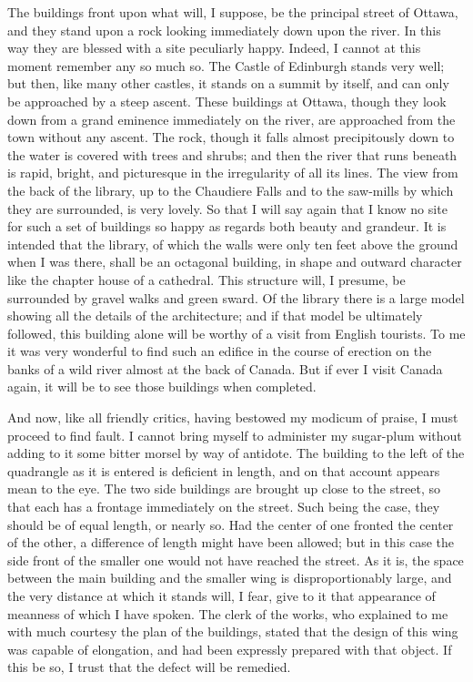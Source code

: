 The buildings front upon what will, I suppose, be the principal
street of Ottawa, and they stand upon a rock looking immediately
down upon the river.  In this way they are blessed with a site
peculiarly happy.  Indeed, I cannot at this moment remember any so
much so.  The Castle of Edinburgh stands very well; but then, like
many other castles, it stands on a summit by itself, and can only
be approached by a steep ascent.  These buildings at Ottawa, though
they look down from a grand eminence immediately on the river, are
approached from the town without any ascent.  The rock, though it
falls almost precipitously down to the water is covered with trees
and shrubs; and then the river that runs beneath is rapid, bright,
and picturesque in the irregularity of all its lines.  The view
from the back of the library, up to the Chaudiere Falls and to the
saw-mills by which they are surrounded, is very lovely.  So that I
will say again that I know no site for such a set of buildings so
happy as regards both beauty and grandeur.  It is intended that the
library, of which the walls were only ten feet above the ground
when I was there, shall be an octagonal building, in shape and
outward character like the chapter house of a cathedral.  This
structure will, I presume, be surrounded by gravel walks and green
sward.  Of the library there is a large model showing all the
details of the architecture; and if that model be ultimately
followed, this building alone will be worthy of a visit from
English tourists.  To me it was very wonderful to find such an
edifice in the course of erection on the banks of a wild river
almost at the back of Canada.  But if ever I visit Canada again, it
will be to see those buildings when completed.

And now, like all friendly critics, having bestowed my modicum of
praise, I must proceed to find fault.  I cannot bring myself to
administer my sugar-plum without adding to it some bitter morsel by
way of antidote.  The building to the left of the quadrangle as it
is entered is deficient in length, and on that account appears mean
to the eye.  The two side buildings are brought up close to the
street, so that each has a frontage immediately on the street.
Such being the case, they should be of equal length, or nearly so.
Had the center of one fronted the center of the other, a difference
of length might have been allowed; but in this case the side front
of the smaller one would not have reached the street.  As it is,
the space between the main building and the smaller wing is
disproportionably large, and the very distance at which it stands
will, I fear, give to it that appearance of meanness of which I
have spoken.  The clerk of the works, who explained to me with much
courtesy the plan of the buildings, stated that the design of this
wing was capable of elongation, and had been expressly prepared
with that object.  If this be so, I trust that the defect will be
remedied.

